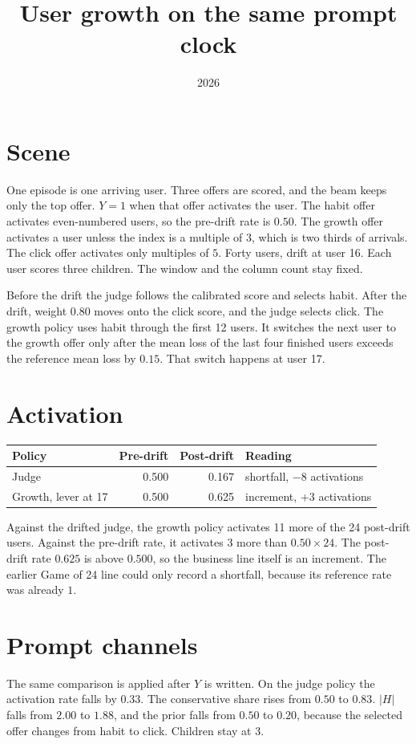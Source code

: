\documentclass[11pt,a4paper]{article}
\title{User growth on the same prompt clock}
\author{}
\date{2026}
\begin{document}
\maketitle

\section{Scene}
One episode is one arriving user. Three offers are scored, and the beam keeps only the top offer.
\(Y=1\) when that offer activates the user.
The habit offer activates even-numbered users, so the pre-drift rate is \(0.50\).
The growth offer activates a user unless the index is a multiple of \(3\), which is two thirds of arrivals.
The click offer activates only multiples of \(5\).
Forty users, drift at user 16. Each user scores three children. The window and the column count stay fixed.

Before the drift the judge follows the calibrated score and selects habit.
After the drift, weight \(0.80\) moves onto the click score, and the judge selects click.
The growth policy uses habit through the first 12 users.
It switches the next user to the growth offer only after the mean loss of the last four finished users exceeds the reference mean loss by \(0.15\).
That switch happens at user 17.

\section{Activation}
\begin{center}
\begin{tabular}{lrrl}
\toprule
Policy & Pre-drift & Post-drift & Reading \\
\midrule
Judge & 0.500 & 0.167 & shortfall, \(-8\) activations \\
Growth, lever at 17 & 0.500 & 0.625 & increment, \(+3\) activations \\
\bottomrule
\end{tabular}
\end{center}

Against the drifted judge, the growth policy activates 11 more of the 24 post-drift users.
Against the pre-drift rate, it activates 3 more than \(0.50\times 24\).
The post-drift rate \(0.625\) is above \(0.500\), so the business line itself is an increment.
The earlier Game of 24 line could only record a shortfall, because its reference rate was already \(1\).

\section{Prompt channels}
The same comparison is applied after \(Y\) is written.
On the judge policy the activation rate falls by \(0.33\).
The conservative share rises from \(0.50\) to \(0.83\).
\(|H|\) falls from \(2.00\) to \(1.88\), and the prior falls from \(0.50\) to \(0.20\), because the selected offer changes from habit to click.
Children stay at 3.
\end{document}
